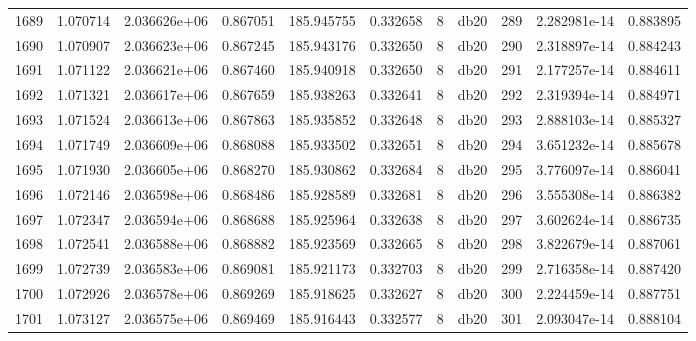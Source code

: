 \begin{tabular}{lrrrrrrlrrr}
1689 &    1.070714 &        2.036626e+06 &  0.867051 &              185.945755 &    0.332658 &       8 &         db20 &    289 &   2.282981e-14 &      0.883895 \\
1690 &    1.070907 &        2.036623e+06 &  0.867245 &              185.943176 &    0.332650 &       8 &         db20 &    290 &   2.318897e-14 &      0.884243 \\
1691 &    1.071122 &        2.036621e+06 &  0.867460 &              185.940918 &    0.332650 &       8 &         db20 &    291 &   2.177257e-14 &      0.884611 \\
1692 &    1.071321 &        2.036617e+06 &  0.867659 &              185.938263 &    0.332641 &       8 &         db20 &    292 &   2.319394e-14 &      0.884971 \\
1693 &    1.071524 &        2.036613e+06 &  0.867863 &              185.935852 &    0.332648 &       8 &         db20 &    293 &   2.888103e-14 &      0.885327 \\
1694 &    1.071749 &        2.036609e+06 &  0.868088 &              185.933502 &    0.332651 &       8 &         db20 &    294 &   3.651232e-14 &      0.885678 \\
1695 &    1.071930 &        2.036605e+06 &  0.868270 &              185.930862 &    0.332684 &       8 &         db20 &    295 &   3.776097e-14 &      0.886041 \\
1696 &    1.072146 &        2.036598e+06 &  0.868486 &              185.928589 &    0.332681 &       8 &         db20 &    296 &   3.555308e-14 &      0.886382 \\
1697 &    1.072347 &        2.036594e+06 &  0.868688 &              185.925964 &    0.332638 &       8 &         db20 &    297 &   3.602624e-14 &      0.886735 \\
1698 &    1.072541 &        2.036588e+06 &  0.868882 &              185.923569 &    0.332665 &       8 &         db20 &    298 &   3.822679e-14 &      0.887061 \\
1699 &    1.072739 &        2.036583e+06 &  0.869081 &              185.921173 &    0.332703 &       8 &         db20 &    299 &   2.716358e-14 &      0.887420 \\
1700 &    1.072926 &        2.036578e+06 &  0.869269 &              185.918625 &    0.332627 &       8 &         db20 &    300 &   2.224459e-14 &      0.887751 \\
1701 &    1.073127 &        2.036575e+06 &  0.869469 &              185.916443 &    0.332577 &       8 &         db20 &    301 &   2.093047e-14 &      0.888104 \\

\end{tabular}
